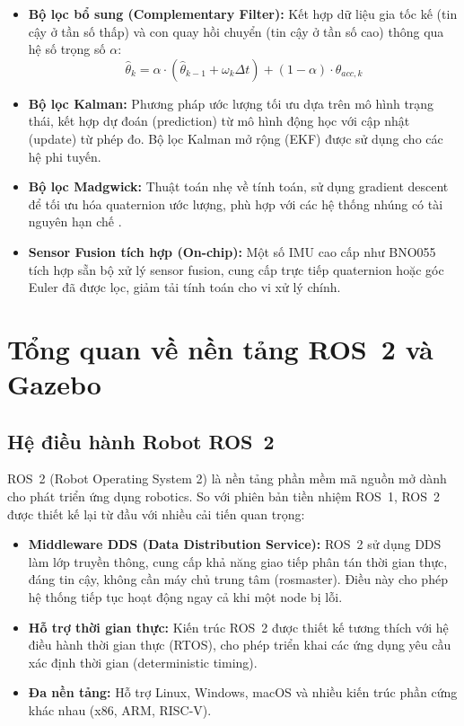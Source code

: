 \begin{itemize}
    \item \textbf{Bộ lọc bổ sung (Complementary Filter):} Kết hợp dữ liệu gia tốc kế (tin cậy ở tần số thấp) và con quay hồi chuyển (tin cậy ở tần số cao) thông qua hệ số trọng số $\alpha$:
    \begin{equation}
        \hat{\theta}_k = \alpha \cdot (\hat{\theta}_{k-1} + \omega_k \Delta t) + (1-\alpha) \cdot \theta_{acc,k}
    \end{equation}

    \item \textbf{Bộ lọc Kalman:} Phương pháp ước lượng tối ưu dựa trên mô hình trạng thái, kết hợp dự đoán (prediction) từ mô hình động học với cập nhật (update) từ phép đo. Bộ lọc Kalman mở rộng (EKF) được sử dụng cho các hệ phi tuyến.

    \item \textbf{Bộ lọc Madgwick:} Thuật toán nhẹ về tính toán, sử dụng gradient descent để tối ưu hóa quaternion ước lượng, phù hợp với các hệ thống nhúng có tài nguyên hạn chế \cite{madgwick2011}.

    \item \textbf{Sensor Fusion tích hợp (On-chip):} Một số IMU cao cấp như BNO055 tích hợp sẵn bộ xử lý sensor fusion, cung cấp trực tiếp quaternion hoặc góc Euler đã được lọc, giảm tải tính toán cho vi xử lý chính.
\end{itemize}

\section{Tổng quan về nền tảng ROS~2 và Gazebo}

\subsection{Hệ điều hành Robot ROS~2}

ROS~2 (Robot Operating System 2) \cite{ros2docs} là nền tảng phần mềm mã nguồn mở dành cho phát triển ứng dụng robotics. So với phiên bản tiền nhiệm ROS~1, ROS~2 được thiết kế lại từ đầu với nhiều cải tiến quan trọng:

\begin{itemize}
    \item \textbf{Middleware DDS (Data Distribution Service):} ROS~2 sử dụng DDS làm lớp truyền thông, cung cấp khả năng giao tiếp phân tán thời gian thực, đáng tin cậy, không cần máy chủ trung tâm (rosmaster). Điều này cho phép hệ thống tiếp tục hoạt động ngay cả khi một node bị lỗi.

    \item \textbf{Hỗ trợ thời gian thực:} Kiến trúc ROS~2 được thiết kế tương thích với hệ điều hành thời gian thực (RTOS), cho phép triển khai các ứng dụng yêu cầu xác định thời gian (deterministic timing).

    \item \textbf{Đa nền tảng:} Hỗ trợ Linux, Windows, macOS và nhiều kiến trúc phần cứng khác nhau (x86, ARM, RISC-V).
\end{itemize}


